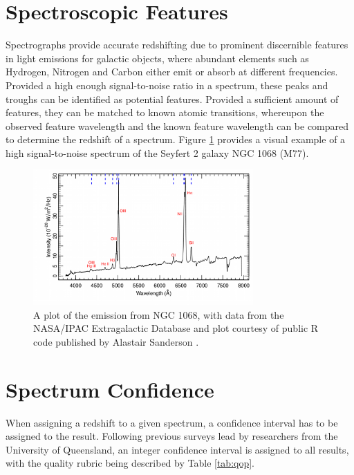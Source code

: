 \documentclass[titlesmallcaps, examinerscopy, copyrightpage]{uqthesis}
\begin{document}
\section{Spectroscopic Features}

Spectrographs provide accurate redshifting due to prominent discernible features in light emissions for galactic objects, where abundant elements such as Hydrogen, Nitrogen and Carbon either emit or absorb at different frequencies. Provided a high enough signal-to-noise ratio in a spectrum, these peaks and troughs can be identified as potential features. Provided a sufficient amount of features, they can be matched to known atomic transitions, whereupon the observed feature wavelength and the known feature wavelength can be compared to determine the redshift of a spectrum. Figure \ref{fig:emission} provides a visual example of a high signal-to-noise spectrum of the Seyfert 2 galaxy NGC 1068 (M77).

\begin{figure}[ht!]
\includegraphics[width=0.75\textwidth]{images/M77_opt_spectrum.png} 
\centering
\caption{A plot of the emission from NGC 1068, with data from the NASA/IPAC Extragalactic Database\cite{nasaDB} and plot courtesy of public R code published by Alastair Sanderson \cite{emission}.}
\label{fig:emission}
\end{figure}


\section{Spectrum Confidence}

When assigning a redshift to a given spectrum, a confidence interval has to be assigned to the result. Following previous surveys lead by researchers from the University of Queensland, an integer confidence interval is assigned to all results, with the quality rubric being described by Table \ref{tab:qop}.
\end{document}
